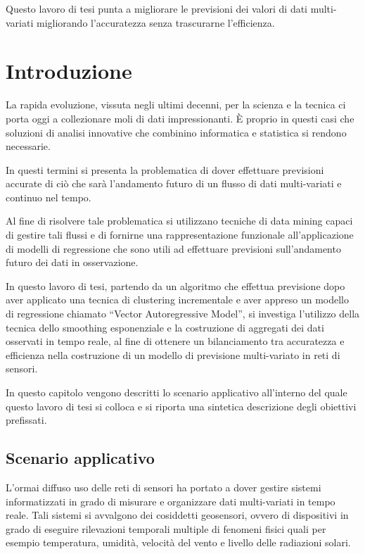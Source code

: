 \documentclass[12pt,a4paper,twoside,openright]{book}
\newcommand{\fncyblank}{\fancyhf{}}
\newenvironment{abstract}%
{\cleardoublepage\fncyblank\null \vfill\begin{center}%
\bfseries \abstractname \end{center}}%
{\vfill\null}
\begin{document}
\begin{abstract}
Questo lavoro di tesi punta a migliorare le previsioni dei valori di dati multi-variati migliorando l'accuratezza senza trascurarne l'efficienza. 
\end{abstract}
\tableofcontents

\chapter{Introduzione}
La rapida evoluzione, vissuta negli ultimi decenni, per la scienza e la tecnica ci porta oggi  a collezionare moli di dati impressionanti. È proprio in questi casi che soluzioni di analisi innovative che combinino informatica e statistica si rendono necessarie. 

In questi termini si presenta la problematica di dover effettuare previsioni accurate di ciò che sarà l’andamento futuro di un flusso di dati multi-variati e continuo nel tempo.

Al fine di risolvere tale problematica si utilizzano tecniche di data mining capaci di gestire tali flussi e di fornirne una rappresentazione funzionale all’applicazione di modelli di regressione che sono utili ad effettuare previsioni sull’andamento futuro dei dati in osservazione. 

In questo lavoro di tesi, partendo da un algoritmo che effettua previsione dopo aver applicato una tecnica di clustering incrementale e aver appreso un modello di regressione chiamato “Vector Autoregressive Model”, si investiga l’utilizzo della tecnica dello smoothing esponenziale e la costruzione di aggregati dei dati osservati in tempo reale, al fine di ottenere un bilanciamento tra accuratezza e efficienza nella costruzione di un modello di previsione multi-variato in reti di sensori.



In questo capitolo vengono descritti lo scenario applicativo all’interno del quale questo lavoro di tesi si colloca e si riporta una sintetica descrizione degli obiettivi prefissati. 
\newpage
\section{Scenario applicativo}
L’ormai diffuso uso delle reti di sensori ha portato a dover gestire sistemi informatizzati in grado di misurare e organizzare dati multi-variati in tempo reale. Tali sistemi si avvalgono dei cosiddetti geosensori, ovvero di dispositivi in grado di eseguire rilevazioni temporali multiple di fenomeni fisici quali per esempio temperatura, umidità, velocità del vento e livello delle radiazioni solari. 
\end{document}
